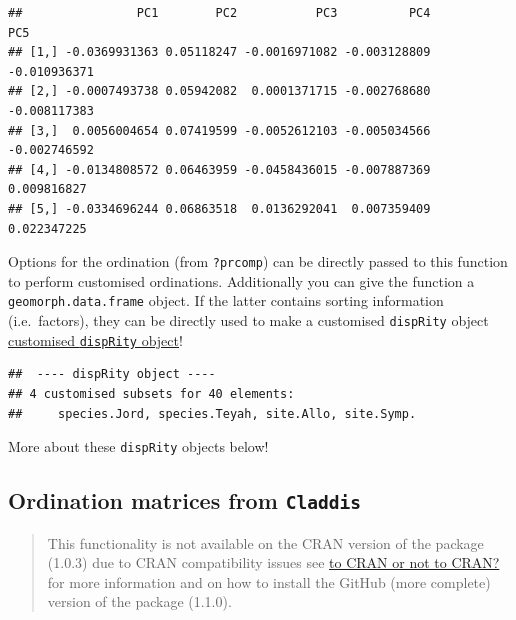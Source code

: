 \documentclass[]{book}
\newenvironment{Shaded}{\begin{snugshade}}{\end{snugshade}}
\newcommand{\KeywordTok}[1]{\textcolor[rgb]{0.13,0.29,0.53}{\textbf{#1}}}
\newcommand{\DataTypeTok}[1]{\textcolor[rgb]{0.13,0.29,0.53}{#1}}
\newcommand{\StringTok}[1]{\textcolor[rgb]{0.31,0.60,0.02}{#1}}
\newcommand{\OperatorTok}[1]{\textcolor[rgb]{0.81,0.36,0.00}{\textbf{#1}}}
\newcommand{\NormalTok}[1]{#1}
\theoremstyle{definition}
\theoremstyle{definition}
\theoremstyle{remark}
\begin{document}
\begin{verbatim}
##                PC1        PC2           PC3          PC4          PC5
## [1,] -0.0369931363 0.05118247 -0.0016971082 -0.003128809 -0.010936371
## [2,] -0.0007493738 0.05942082  0.0001371715 -0.002768680 -0.008117383
## [3,]  0.0056004654 0.07419599 -0.0052612103 -0.005034566 -0.002746592
## [4,] -0.0134808572 0.06463959 -0.0458436015 -0.007887369  0.009816827
## [5,] -0.0334696244 0.06863518  0.0136292041  0.007359409  0.022347225
\end{verbatim}

Options for the ordination (from \texttt{?prcomp}) can be directly
passed to this function to perform customised ordinations. Additionally
you can give the function a \texttt{geomorph.data.frame} object. If the
latter contains sorting information (i.e.~factors), they can be directly
used to make a customised \texttt{dispRity} object
\protect\hyperlink{customised-subsets}{customised \texttt{dispRity}
object}!

\begin{Shaded}
\end{Shaded}

\begin{verbatim}
##  ---- dispRity object ---- 
## 4 customised subsets for 40 elements:
##     species.Jord, species.Teyah, site.Allo, site.Symp.
\end{verbatim}

More about these \texttt{dispRity} objects below!

\hypertarget{Claddis-ordination}{\subsection{\texorpdfstring{Ordination
matrices from
\texttt{Claddis}}{Ordination matrices from Claddis}}\label{Claddis-ordination}}

\begin{quote}
This functionality is not available on the CRAN version of the package
(1.0.3) due to CRAN compatibility issues see
\protect\hyperlink{noCRAN}{to CRAN or not to CRAN?} for more information
and on how to install the GitHub (more complete) version of the package
(1.1.0).
\end{quote}
\end{document}
